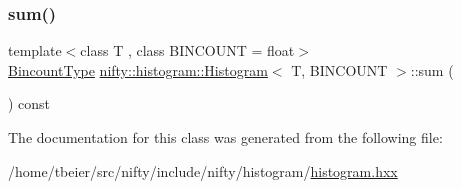 \subsubsection{\texorpdfstring{sum()}{sum()}}
{\footnotesize\ttfamily template$<$class T , class B\+I\+N\+C\+O\+U\+NT  = float$>$ \\
\hyperlink{classnifty_1_1histogram_1_1Histogram_a19ad5e06bce1f70819a7ac9cdb708cf3}{Bincount\+Type} \hyperlink{classnifty_1_1histogram_1_1Histogram}{nifty\+::histogram\+::\+Histogram}$<$ T, B\+I\+N\+C\+O\+U\+NT $>$\+::sum (\begin{DoxyParamCaption}{ }\end{DoxyParamCaption}) const\hspace{0.3cm}{\ttfamily [inline]}}



The documentation for this class was generated from the following file\+:\begin{DoxyCompactItemize}
\item 
/home/tbeier/src/nifty/include/nifty/histogram/\hyperlink{histogram_8hxx}{histogram.\+hxx}\end{DoxyCompactItemize}
